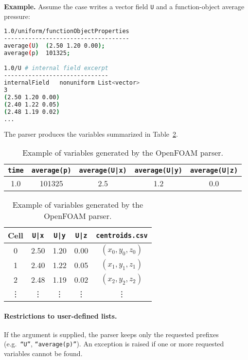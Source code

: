 \noindent
\textbf{Example.}  
Assume the case writes a vector field \texttt{U} and a function-object
average pressure:

\begin{lstlisting}[language=bash]
1.0/uniform/functionObjectProperties
------------------------------------
average(U)  (2.50 1.20 0.00);
average(p)  101325;

1.0/U # internal field excerpt
------------------------------
internalField   nonuniform List<vector>
3
(2.50 1.20 0.00)
(2.40 1.22 0.05)
(2.48 1.19 0.02)
...
\end{lstlisting}

The parser produces the variables summarized in
Table~\ref{tab:ofVariableExample}.

\begin{table}[ht]
\centering
\caption{Example of variables generated by the OpenFOAM parser.}
\label{tab:ofVariableExample}
\begin{tabular}{|c|c|c|c|c|}
\hline
\texttt{time} & \texttt{average(p)} & \texttt{average(U|x)} & \texttt{average(U|y)} & \texttt{average(U|z)} \\
\hline
1.0 & 101325 & 2.5 & 1.2 & 0.0 \\ \hline
\end{tabular}

\vspace{0.3cm}

\begin{tabular}{|c|c|c|c|c|}
\hline
\textbf{Cell} & \texttt{U|x} & \texttt{U|y} & \texttt{U|z} & \texttt{centroids.csv} \\
\hline
0 & 2.50 & 1.20 & 0.00 & $(x_0,y_0,z_0)$ \\
1 & 2.40 & 1.22 & 0.05 & $(x_1,y_1,z_1)$ \\
2 & 2.48 & 1.19 & 0.02 & $(x_2,y_2,z_2)$ \\
\vdots & \vdots & \vdots & \vdots & \vdots \\ \hline
\end{tabular}
\end{table}

\paragraph{Restrictions to user-defined lists.}
If the  argument is supplied, the parser keeps only the
requested prefixes (e.g.\ \texttt{``U''}, \texttt{``average(p)''}).  
An exception is raised if one or more requested variables cannot be found.


